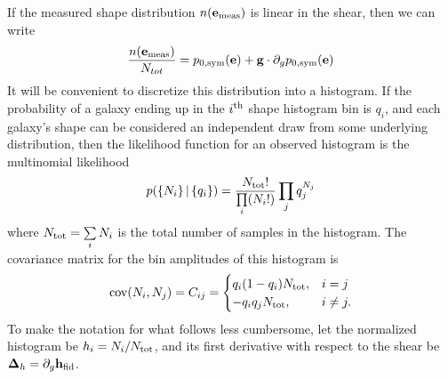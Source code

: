\documentclass[iop]{emulateapj}
\newcommand\rmcomment[1]{\textcolor{red}{(RM: #1)}}
\begin{document}

If the measured shape distribution $n(\mathbf{e}_{\rm meas})$ is linear
in the shear, then we can write
\begin{align}
  \frac{n(\mathbf{e}_{\rm meas})}{N_{tot}} = p_{0,\rm sym}(\mathbf{e}) + \mathbf{g}\cdot \partial_{g} p_{0,\rm sym}(\mathbf{e})
\end{align}
It will be convenient to discretize this distribution into a
histogram. If the probability of a galaxy ending up in the
$i^{\rm th}$ shape histogram bin is $q_i$, and each galaxy's shape can
be considered an independent draw from some underlying distribution,
then the likelihood function for an observed histogram is the
multinomial likelihood
\begin{align}
p( \left\{N_i\right\} |\left\{ q_i\right\} ) = \frac{N_{\rm tot}!}{\prod\limits_i (N_i!)}\prod\limits_j q_j^{N_j}
\label{eqn:multnomial}
\end{align}
where $N_{\rm tot} = \sum\limits_i N_i$ is the total number of samples
in the histogram. The covariance matrix for the
bin amplitudes of this histogram is
\begin{align}
{\rm cov}(N_i, N_j) = C_{ij} = \begin{cases}
  q_i(1-q_i)N_{\rm tot}, & i=j \\
  -q_iq_j N_{\rm tot}, & i \neq j.
\end{cases}
\end{align}
To make the notation for what follows less cumbersome, let the
normalized histogram be $h_i = N_i / N_{\rm tot}$, and its first
derivative with respect to the shear be
$\mathbf{\Delta}_h=\partial_{g}\mathbf{h}_{\rm fid}$.
\end{document}
